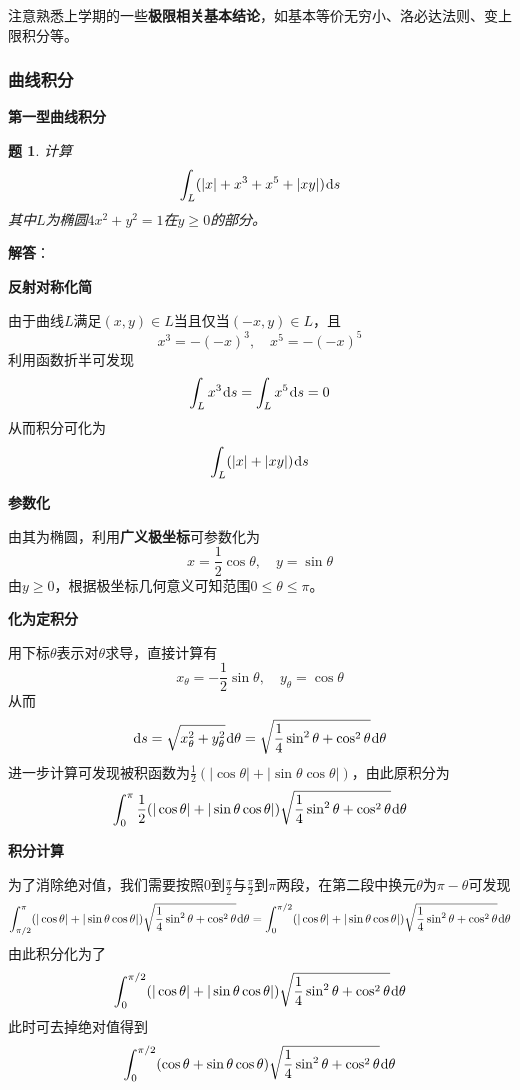 \documentclass[a4paper,UTF8,fontset=windows,AutoFakeBold]{ctexart}
\newcommand*{\dr}{\hspace{0.07em}\mathrm{d}}
\newcommand*{\note}{\noindent *}
\theoremstyle{ex}
\newtheorem{exercise}{题}
\newcommand{\sol}[1]{{\vspace{5pt}\kaishu\noindent\textbf{解答}：\vspace{-3pt}
\begin{compactitem}
    \item[] #1
\end{compactitem}
}}
\begin{document}
\note 注意熟悉上学期的一些\textbf{极限相关基本结论}，如基本等价无穷小、洛必达法则、变上限积分等。

\subsubsection{曲线积分}
\noindent\textbf{第一型曲线积分}
\begin{framed}
\begin{exercise}
    计算
    $$\int_L(|x|+x^3+x^5+|xy|)\dr s$$
    其中$L$为椭圆$4x^2+y^2=1$在$y\ge0$的部分。
\end{exercise}
\sol{
    \item \textbf{反射对称化简}
    
    由于曲线$L$满足$(x,y)\in L$当且仅当$(-x,y)\in L$，且
    $$x^3=-(-x)^3,\quad x^5=-(-x)^5$$
    利用函数折半可发现
    $$\int_Lx^3\dr s=\int_Lx^5\dr s=0$$
    从而积分可化为
    $$\int_L(|x|+|xy|)\dr s$$

    \item \textbf{参数化}
            
    由其为椭圆，利用\textbf{广义极坐标}可参数化为
    $$x=\frac{1}{2}\cos\theta,\quad y=\sin\theta$$
    由$y\ge0$，根据极坐标几何意义可知范围$0\le\theta\le\pi$。

    \item \textbf{化为定积分}

    用下标$\theta$表示对$\theta$求导，直接计算有
    $$x_\theta=-\frac{1}{2}\sin\theta,\quad y_\theta=\cos\theta$$
    从而
    $$\dr s=\sqrt{x_\theta^2+y_\theta^2}\dr\theta=\sqrt{\frac{1}{4}\sin^2\theta+\cos^2\theta}\dr\theta$$
    进一步计算可发现被积函数为$\frac{1}{2}(|\cos\theta|+|\sin\theta\cos\theta|)$，由此原积分为
    $$\int_0^\pi\frac{1}{2}(|\cos\theta|+|\sin\theta\cos\theta|)\sqrt{\frac{1}{4}\sin^2\theta+\cos^2\theta}\dr\theta$$

    \item \textbf{积分计算}
            
    为了消除绝对值，我们需要按照0到$\frac{\pi}{2}$与$\frac{\pi}{2}$到$\pi$两段，在第二段中换元$\theta$为$\pi-\theta$可发现
    $$\int_{\pi/2}^\pi(|\cos\theta|+|\sin\theta\cos\theta|)\sqrt{\frac{1}{4}\sin^2\theta+\cos^2\theta}\dr\theta=\int_0^{\pi/2}(|\cos\theta|+|\sin\theta\cos\theta|)\sqrt{\frac{1}{4}\sin^2\theta+\cos^2\theta}\dr\theta$$
    由此积分化为了
    $$\int_0^{\pi/2}(|\cos\theta|+|\sin\theta\cos\theta|)\sqrt{\frac{1}{4}\sin^2\theta+\cos^2\theta}\dr\theta$$
    此时可去掉绝对值得到
    $$\int_0^{\pi/2}(\cos\theta+\sin\theta\cos\theta)\sqrt{\frac{1}{4}\sin^2\theta+\cos^2\theta}\dr\theta$$

}
\end{framed}
\end{document}
